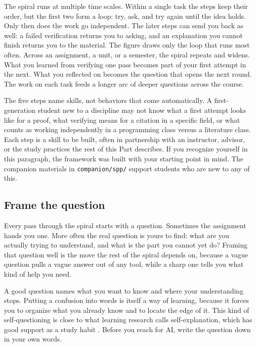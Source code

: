 \documentclass{SIAMbook2023}
\begin{document}
The spiral runs at multiple time scales. Within a single task the steps keep their order, but the first two form a loop: try, ask, and try again until the idea holds. Only then does the work go independent. The later steps can send you back as well: a failed verification returns you to asking, and an explanation you cannot finish returns you to the material. The figure draws only the loop that runs most often. Across an assignment, a unit, or a semester, the spiral repeats and widens. What you learned from verifying one pass becomes part of your first attempt in the next. What you reflected on becomes the question that opens the next round. The work on each task feeds a longer arc of deeper questions across the course.

The five steps name skills, not behaviors that come automatically. A first-generation student new to a discipline may not know what a first attempt looks like for a proof, what verifying means for a citation in a specific field, or what counts as working independently in a programming class versus a literature class. Each step is a skill to be built, often in partnership with an instructor, advisor, or the study practices the rest of this Part describes. If you recognize yourself in this paragraph, the framework was built with your starting point in mind. The companion materials in \texttt{companion/spp/} support students who are new to any of this.

\subsection{Frame the question}
\label{subsec:frame-question}%

Every pass through the spiral starts with a question. Sometimes the assignment hands you one. More often the real question is yours to find: what are you actually trying to understand, and what is the part you cannot yet do? Framing that question well is the move the rest of the spiral depends on, because a vague question pulls a vague answer out of any tool, while a sharp one tells you what kind of help you need.

A good question names what you want to know and where your understanding stops. Putting a confusion into words is itself a way of learning, because it forces you to organize what you already know and to locate the edge of it. This kind of self-questioning is close to what learning research calls self-explanation, which has good support as a study habit \citep{dunlosky2013improving}. Before you reach for AI, write the question down in your own words.
\end{document}
